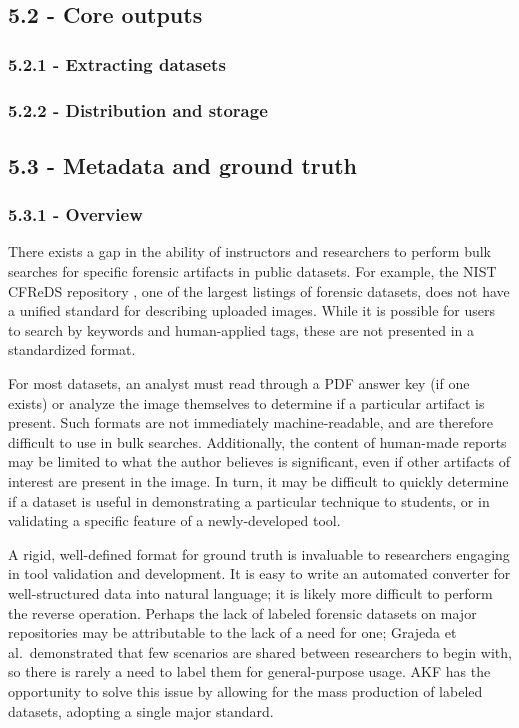 \subsection{5.2 - Core outputs}\label{core-outputs}

\subsubsection{5.2.1 - Extracting datasets}\label{extracting-datasets}

\subsubsection{5.2.2 - Distribution and
storage}\label{distribution-and-storage}

\subsection{5.3 - Metadata and ground
truth}\label{metadata-and-ground-truth}

\subsubsection{5.3.1 - Overview}\label{overview-1}

There exists a gap in the ability of instructors and researchers to
perform bulk searches for specific forensic artifacts in public
datasets. For example, the NIST CFReDS repository
\cite{nationalinstituteofstandardsandtechnologyCFReDSPortal}, one of
the largest listings of forensic datasets, does not have a unified
standard for describing uploaded images. While it is possible for users
to search by keywords and human-applied tags, these are not presented in
a standardized format.

For most datasets, an analyst must read through a PDF answer key (if one
exists) or analyze the image themselves to determine if a particular
artifact is present. Such formats are not immediately machine-readable,
and are therefore difficult to use in bulk searches. Additionally, the
content of human-made reports may be limited to what the author believes
is significant, even if other artifacts of interest are present in the
image. In turn, it may be difficult to quickly determine if a dataset is
useful in demonstrating a particular technique to students, or in
validating a specific feature of a newly-developed tool.

A rigid, well-defined format for ground truth is invaluable to
researchers engaging in tool validation and development. It is easy to
write an automated converter for well-structured data into natural
language; it is likely more difficult to perform the reverse operation.
Perhaps the lack of labeled forensic datasets on major repositories may
be attributable to the lack of a need for one; Grajeda et
al.~demonstrated that few scenarios are shared between researchers to
begin with, so there is rarely a need to label them for general-purpose
usage. AKF has the opportunity to solve this issue by allowing for the
mass production of labeled datasets, adopting a single major standard.

